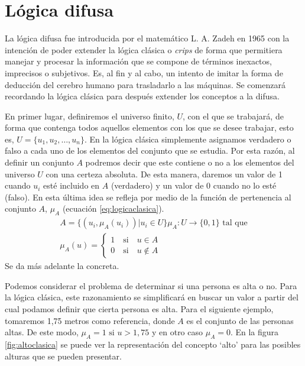 \documentclass[main]{subfiles}
\begin{document}
\section{Lógica difusa}\label{sec:logicadifusa}
La lógica difusa fue introducida por el matemático L. A. Zadeh \cite{art:zadeh} en 1965 con la intención de poder extender la lógica clásica o {\em crips} de forma que permitiera manejar y procesar la información que se compone de términos inexactos, imprecisos o subjetivos. Es, al fin y al cabo, un intento de imitar la forma de deducción del cerebro humano para trasladarlo a las máquinas. Se comenzará recordando la lógica clásica para después extender los conceptos a la difusa.

En primer lugar, definiremos el universo finito, $U$,  con el que se  trabajará, de forma que contenga todos aquellos elementos con los que se desee trabajar, esto es, $U = \{u_{1}, u_{2}, \dots, u_{n}\}$. En la lógica clásica simplemente asignamos verdadero o falso a cada uno de los elementos del conjunto que se estudia. Por esta razón, al definir un conjunto $A$ podremos decir que este contiene o no a los elementos del universo $U$ con una certeza absoluta. De esta manera, daremos un valor de 1 cuando $u_{i}$ esté incluido en $A$ (verdadero) y un valor de 0 cuando no lo esté (falso). En esta última idea se refleja por medio de la función de pertenencia al conjunto  $A$, $\mu_{A}$ (ecuación \ref{eq:logicaclasica}).
\begin{equation}\label{eq:logicaclasica}
\begin{aligned}
	A = \{(u_{i}, \mu_{A}(u_{i})) | u_{i}\in U\}

	\mu_{A}:U\rightarrow \{0,1\} \text{ tal que}\\
	\mu_{A}(u) = \left\{ \begin{aligned}
		1 \quad\text{si}\quad u\in A\\
		0 \quad\text{si}\quad u\notin A
 	\end{aligned}\right.
\end{aligned}
\end{equation}
 Se da más adelante la concreta.

 Podemos considerar el problema de determinar si una persona es alta o no. Para la lógica clásica, este razonamiento se simplificará en buscar un valor a partir del cual podamos definir que cierta persona es alta. Para el siguiente ejemplo, tomaremos 1,75 metros como referencia, donde $A$ es el conjunto de las personas altas. De este modo, $\mu_{A}=1 \text{ si } u>1,75$ y en otro caso $\mu_{A}=0$. En la figura \ref{fig:altoclasica} se puede ver la representación del concepto `alto' para las posibles alturas que se pueden presentar.
\end{document}
